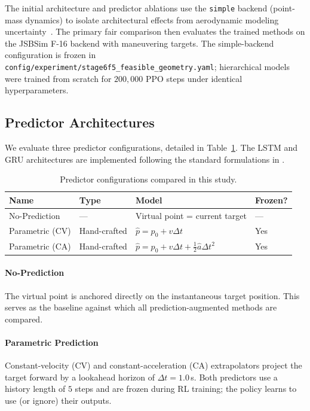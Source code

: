 \documentclass[conference]{IEEEtran}
\begin{document}
The initial architecture and predictor ablations use the \texttt{simple} backend (point-mass dynamics) to isolate architectural effects from aerodynamic modeling uncertainty~\cite{jsbsim}. The primary fair comparison then evaluates the trained methods on the JSBSim F-16 backend with maneuvering targets. The simple-backend configuration is frozen in \texttt{config/experiment/stage6f5\_feasible\_geometry.yaml}; hierarchical models were trained from scratch for $200{,}000$ PPO steps under identical hyperparameters.

\subsection{Predictor Architectures}

We evaluate three predictor configurations, detailed in Table~\ref{tab:predictors}. The LSTM and GRU architectures are implemented following the standard formulations in \cite{lstm,gru}.

\begin{table}[t]
\centering
\caption{Predictor configurations compared in this study.}
\label{tab:predictors}
\begin{tabular}{llll}
\toprule
Name & Type & Model & Frozen? \\
\midrule
No-Prediction & --- & Virtual point = current target & --- \\
Parametric (CV) & Hand-crafted & $\hat{p} = p_0 + v\Delta t$ & Yes \\
Parametric (CA) & Hand-crafted & $\hat{p} = p_0 + v\Delta t + \frac{1}{2}\hat{a}\Delta t^2$ & Yes \\
\bottomrule
\end{tabular}
\end{table}

\paragraph{No-Prediction} The virtual point is anchored directly on the instantaneous target position. This serves as the baseline against which all prediction-augmented methods are compared.

\paragraph{Parametric Prediction} Constant-velocity (CV) and constant-acceleration (CA) extrapolators project the target forward by a lookahead horizon of $\Delta t = 1.0$\,s. Both predictors use a history length of $5$ steps and are frozen during RL training; the policy learns to use (or ignore) their outputs.
\end{document}
